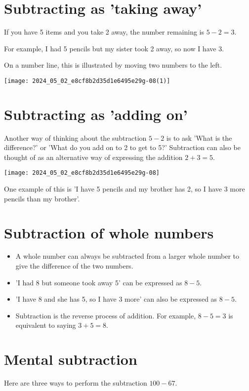 \documentclass[10pt]{article}
\begin{document}
\section*{Subtracting as 'taking away'}
If you have 5 items and you take 2 away, the number remaining is \(5-2=3\).

For example, I had 5 pencils but my sister took 2 away, so now I have 3.

On a number line, this is illustrated by moving two numbers to the left.

\begin{center}
\texttt{[image: 2024\_05\_02\_e8cf8b2d35d1e6495e29g-08(1)]}
\end{center}

\section*{Subtracting as 'adding on'}
Another way of thinking about the subtraction \(5-2\) is to ask 'What is the difference?' or 'What do you add on to 2 to get to 5?' Subtraction can also be thought of as an alternative way of expressing the addition \(2+3=5\).

\begin{center}
\texttt{[image: 2024\_05\_02\_e8cf8b2d35d1e6495e29g-08]}
\end{center}

One example of this is 'I have 5 pencils and my brother has 2, so I have 3 more pencils than my brother'.

\section*{Subtraction of whole numbers}
\begin{itemize}
  \item A whole number can always be subtracted from a larger whole number to give the difference of the two numbers.
  \item 'I had 8 but someone took away 5' can be expressed as \(8-5\).
  \item 'I have 8 and she has 5, so I have 3 more' can also be expressed as \(8-5\).
  \item Subtraction is the reverse process of addition. For example, \(8-5=3\) is equivalent to saying \(3+5=8\).
\end{itemize}

\section*{Mental subtraction}
Here are three ways to perform the subtraction \(100-67\).
\end{document}
